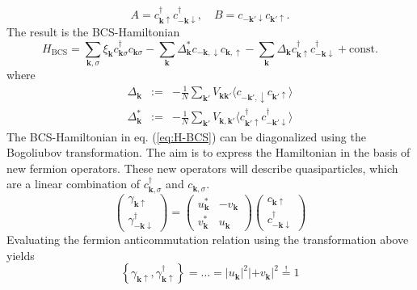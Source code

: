 \begin{equation}
A = c^{\dagger}_{\mathbf{k} \uparrow }c^{\dagger}_{- \mathbf{k} \downarrow}, \quad B =  c_{- \mathbf{k'} \downarrow} c_{\mathbf{k'} \uparrow} .
\end{equation}
The result is the BCS-Hamiltonian
\begin{equation}
H_{\text{BCS}} = \sum_{\mathbf{k}, \sigma} \xi_{\mathbf{k}} c^{\dagger}_{\mathbf{k} \sigma }c_{\mathbf{k} \sigma }    -  \sum_{\mathbf{k}} \Delta_{\mathbf{k}}^* c_{-\mathbf{k}, \downarrow} c_{\mathbf{k}, \uparrow}  - \sum_{\mathbf{k}} \Delta_{\mathbf{k}}  c^{\dagger}_{\mathbf{k} \uparrow} c^{\dagger}_{- \mathbf{k} \downarrow} + \text{const.}\label{eq:H-BCS}
\end{equation}
where 
\begin{eqnarray}
\Delta_{\mathbf{k}} &:=& - \frac{1}{N} \sum_{\mathbf{k'}} V_\mathbf{{\mathbf{k} \mathbf{k'}}} \langle c_{-\mathbf{k'}, \downarrow} c_{\mathbf{k'} \uparrow} \rangle \\
\Delta_{\mathbf{k}}^* &:=& - \frac{1}{N} \sum_{\mathbf{k'}} V_\mathbf{{\mathbf{k}, \mathbf{k'}}}  \langle  c^{\dagger}_{\mathbf{k'} \uparrow} c^{\dagger}_{- \mathbf{k'} \downarrow} \rangle
\end{eqnarray}
The BCS-Hamiltonian in eq. (\ref{eq:H-BCS}) can be diagonalized using the Bogoliubov transformation. The aim is to express the Hamiltonian in the basis of new fermion operators. These new operators will describe quasiparticles, which are a linear combination of $c^\dagger_{\mathbf{k}, \sigma}$ and $c_{\mathbf{k}, \sigma}$.
\begin{equation}
\begin{pmatrix}
\gamma_{\mathbf{k} \uparrow} \\ \gamma^{\dagger}_{-\mathbf{k} \downarrow}  
\end{pmatrix} = \begin{pmatrix}
u^*_{\mathbf{k} } & -v_{\mathbf{k} } \\
v^*_{\mathbf{k} }  & u_{\mathbf{k} } 
\end{pmatrix} 
\begin{pmatrix}
c_{\mathbf{k} \uparrow} \\ c^{\dagger}_{-\mathbf{k} \downarrow}  
\end{pmatrix}
\end{equation}\label{eq:bogol-trans}
Evaluating the fermion anticommutation relation using the transformation above yields
\begin{equation}
\left\{ \gamma_{\mathbf{k} \uparrow}, \gamma^{\dagger}_{\mathbf{k} \uparrow}  \right\}  = \dots = |u_{\mathbf{k}}|^2 | + v_{\mathbf{k}}|^2 \stackrel{!}{=} 1
\end{equation}
